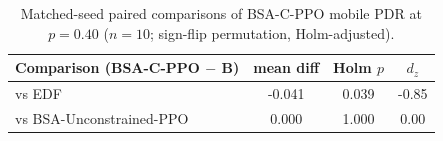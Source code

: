 \begin{table}[t]\centering\small
\caption{Matched-seed paired comparisons of BSA-C-PPO mobile PDR at $p=0.40$ ($n=10$; sign-flip permutation, Holm-adjusted).}\label{tab:stats}
\begin{tabular}{@{}lccc@{}}\toprule
Comparison (BSA-C-PPO $-$ B) & mean diff & Holm $p$ & $d_z$ \\ \midrule
vs EDF & -0.041 & 0.039 & -0.85 \\
vs BSA-Unconstrained-PPO & 0.000 & 1.000 & 0.00 \\
\bottomrule\end{tabular}\end{table}